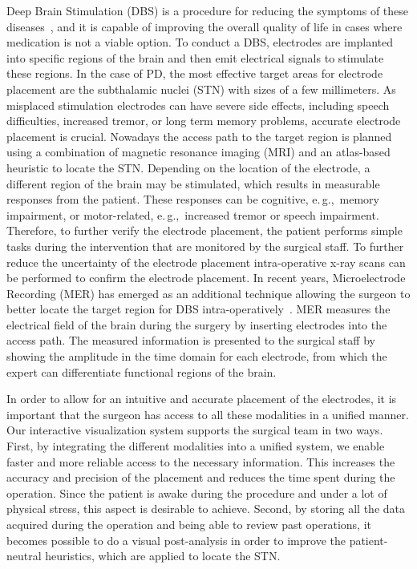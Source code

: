 \documentclass{egpubl}
\begin{document}
Deep Brain Stimulation (DBS) is a procedure for reducing the symptoms of these diseases~\cite{Benabid2009}, and it is capable of improving the overall quality of life in cases where medication is not a viable option. To conduct a DBS, electrodes are implanted into specific regions of the brain and then emit electrical signals to stimulate these regions. In the case of PD, the most effective target areas for electrode placement are the subthalamic nuclei (STN) with sizes of a few millimeters. As misplaced stimulation electrodes can have severe side effects, including speech difficulties, increased tremor, or long term memory problems, accurate electrode placement is crucial. Nowadays the access path to the target region is planned using a combination of magnetic resonance imaging (MRI) and an atlas-based heuristic to locate the STN. Depending on the location of the electrode, a different region of the brain may be stimulated, which results in measurable responses from the patient. These responses can be cognitive, e.\,g.,~memory impairment, or motor-related, e.\,g.,~increased tremor or speech impairment. Therefore, to further verify the electrode placement, the patient performs simple tasks during the intervention that are monitored by the surgical staff.  To further reduce the uncertainty of the electrode placement intra-operative x-ray scans can be performed to confirm the electrode placement. In recent years, Microelectrode Recording (MER) has emerged as an additional technique allowing the surgeon to better locate the target region for DBS intra-operatively~\cite{Lenz1988}. MER measures the electrical field of the brain during the surgery by inserting electrodes into the access path. The measured information is presented to the surgical staff by showing the amplitude in the time domain for each electrode, from which the expert can differentiate functional regions of the brain.

In order to allow for an intuitive and accurate placement of the electrodes, it is important that the surgeon has access to all these modalities in a unified manner. Our interactive visualization system supports the surgical team in two ways. First, by integrating the different modalities into a unified system, we enable faster and more reliable access to the necessary information. This increases the accuracy and precision of the placement and reduces the time spent during the operation. Since the patient is awake during the procedure and under a lot of physical stress, this aspect is desirable to achieve. Second, by storing all the data acquired during the operation and being able to review past operations, it becomes possible to do a visual post-analysis in order to improve the patient-neutral heuristics, which are applied to locate the STN.
\end{document}

